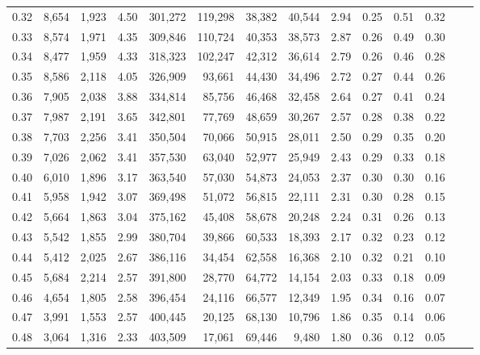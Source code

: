 \begin{tabular}{rrrrrrrrrrrrrr}
0.32 &   8,654 &  1,923 &    4.50 &  301,272 &  119,298 &  38,382 &  40,544 &  2.94 &  0.25 &  0.51 &      0.32 \\
0.33 &   8,574 &  1,971 &    4.35 &  309,846 &  110,724 &  40,353 &  38,573 &  2.87 &  0.26 &  0.49 &      0.30 \\
0.34 &   8,477 &  1,959 &    4.33 &  318,323 &  102,247 &  42,312 &  36,614 &  2.79 &  0.26 &  0.46 &      0.28 \\
0.35 &   8,586 &  2,118 &    4.05 &  326,909 &   93,661 &  44,430 &  34,496 &  2.72 &  0.27 &  0.44 &      0.26 \\
0.36 &   7,905 &  2,038 &    3.88 &  334,814 &   85,756 &  46,468 &  32,458 &  2.64 &  0.27 &  0.41 &      0.24 \\
0.37 &   7,987 &  2,191 &    3.65 &  342,801 &   77,769 &  48,659 &  30,267 &  2.57 &  0.28 &  0.38 &      0.22 \\
0.38 &   7,703 &  2,256 &    3.41 &  350,504 &   70,066 &  50,915 &  28,011 &  2.50 &  0.29 &  0.35 &      0.20 \\
0.39 &   7,026 &  2,062 &    3.41 &  357,530 &   63,040 &  52,977 &  25,949 &  2.43 &  0.29 &  0.33 &      0.18 \\
0.40 &   6,010 &  1,896 &    3.17 &  363,540 &   57,030 &  54,873 &  24,053 &  2.37 &  0.30 &  0.30 &      0.16 \\
0.41 &   5,958 &  1,942 &    3.07 &  369,498 &   51,072 &  56,815 &  22,111 &  2.31 &  0.30 &  0.28 &      0.15 \\
0.42 &   5,664 &  1,863 &    3.04 &  375,162 &   45,408 &  58,678 &  20,248 &  2.24 &  0.31 &  0.26 &      0.13 \\
0.43 &   5,542 &  1,855 &    2.99 &  380,704 &   39,866 &  60,533 &  18,393 &  2.17 &  0.32 &  0.23 &      0.12 \\
0.44 &   5,412 &  2,025 &    2.67 &  386,116 &   34,454 &  62,558 &  16,368 &  2.10 &  0.32 &  0.21 &      0.10 \\
0.45 &   5,684 &  2,214 &    2.57 &  391,800 &   28,770 &  64,772 &  14,154 &  2.03 &  0.33 &  0.18 &      0.09 \\
0.46 &   4,654 &  1,805 &    2.58 &  396,454 &   24,116 &  66,577 &  12,349 &  1.95 &  0.34 &  0.16 &      0.07 \\
0.47 &   3,991 &  1,553 &    2.57 &  400,445 &   20,125 &  68,130 &  10,796 &  1.86 &  0.35 &  0.14 &      0.06 \\
0.48 &   3,064 &  1,316 &    2.33 &  403,509 &   17,061 &  69,446 &   9,480 &  1.80 &  0.36 &  0.12 &      0.05 \\

\end{tabular}
